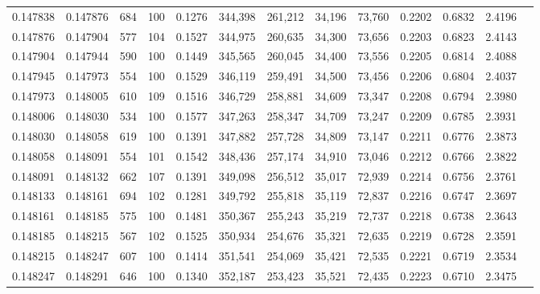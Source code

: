 \begin{tabular}{rrrrrrrrrrrrr}
0.147838 & 0.147876 &   684 & 100 &                                     0.1276 & 344,398 & 261,212 &  34,196 &  73,760 & 0.2202 & 0.6832 & 2.4196 \\
0.147876 & 0.147904 &   577 & 104 &                                     0.1527 & 344,975 & 260,635 &  34,300 &  73,656 & 0.2203 & 0.6823 & 2.4143 \\
0.147904 & 0.147944 &   590 & 100 &                                     0.1449 & 345,565 & 260,045 &  34,400 &  73,556 & 0.2205 & 0.6814 & 2.4088 \\
0.147945 & 0.147973 &   554 & 100 &                                     0.1529 & 346,119 & 259,491 &  34,500 &  73,456 & 0.2206 & 0.6804 & 2.4037 \\
0.147973 & 0.148005 &   610 & 109 &                                     0.1516 & 346,729 & 258,881 &  34,609 &  73,347 & 0.2208 & 0.6794 & 2.3980 \\
0.148006 & 0.148030 &   534 & 100 &                                     0.1577 & 347,263 & 258,347 &  34,709 &  73,247 & 0.2209 & 0.6785 & 2.3931 \\
0.148030 & 0.148058 &   619 & 100 &                                     0.1391 & 347,882 & 257,728 &  34,809 &  73,147 & 0.2211 & 0.6776 & 2.3873 \\
0.148058 & 0.148091 &   554 & 101 &                                     0.1542 & 348,436 & 257,174 &  34,910 &  73,046 & 0.2212 & 0.6766 & 2.3822 \\
0.148091 & 0.148132 &   662 & 107 &                                     0.1391 & 349,098 & 256,512 &  35,017 &  72,939 & 0.2214 & 0.6756 & 2.3761 \\
0.148133 & 0.148161 &   694 & 102 &                                     0.1281 & 349,792 & 255,818 &  35,119 &  72,837 & 0.2216 & 0.6747 & 2.3697 \\
0.148161 & 0.148185 &   575 & 100 &                                     0.1481 & 350,367 & 255,243 &  35,219 &  72,737 & 0.2218 & 0.6738 & 2.3643 \\
0.148185 & 0.148215 &   567 & 102 &                                     0.1525 & 350,934 & 254,676 &  35,321 &  72,635 & 0.2219 & 0.6728 & 2.3591 \\
0.148215 & 0.148247 &   607 & 100 &                                     0.1414 & 351,541 & 254,069 &  35,421 &  72,535 & 0.2221 & 0.6719 & 2.3534 \\
0.148247 & 0.148291 &   646 & 100 &                                     0.1340 & 352,187 & 253,423 &  35,521 &  72,435 & 0.2223 & 0.6710 & 2.3475 \\

\end{tabular}
